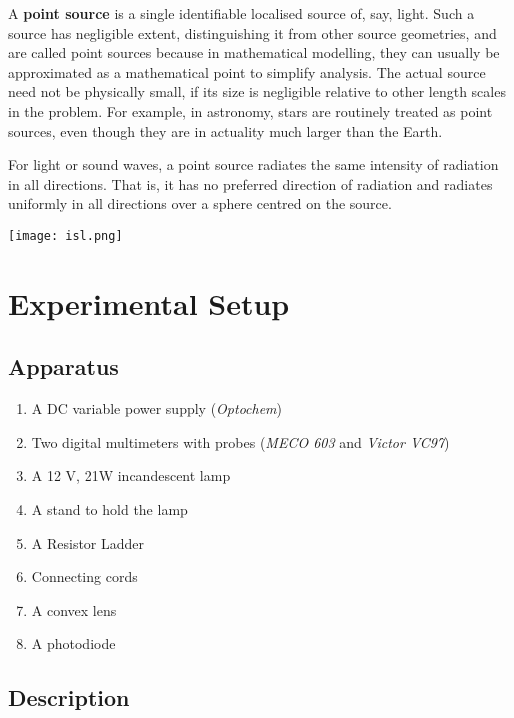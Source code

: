 \begin{minipage}{0.5\linewidth}
A \textbf{point source} is a single identifiable localised source of, say, light. Such a source has negligible extent, distinguishing it from other source geometries, and are called point sources because in mathematical modelling, they can usually be approximated as a mathematical point to simplify analysis. The actual source need not be physically small, if its size is negligible relative to other length scales in the problem. For example, in astronomy, stars are routinely treated as point sources, even though they are in actuality much larger than the Earth.

For light or sound waves, a point source radiates the same intensity of radiation in all directions. That is, it has no preferred direction of radiation and radiates uniformly in all directions over a sphere centred on the source.
\end{minipage}
\begin{minipage}{0.5\linewidth}
\centering
\texttt{[image: isl.png]}
\end{minipage}



\section*{Experimental Setup}

\subsection*{Apparatus}

\begin{enumerate}
\item A DC variable power supply (\textit{Optochem})
\item Two digital multimeters with probes (\textit{MECO 603} and \textit{Victor VC97})
\item A 12 V, 21W incandescent lamp
\item A stand to hold the lamp
\item A Resistor Ladder
\item Connecting cords
\item A convex lens
\item A photodiode

\end{enumerate}


\subsection*{Description}

